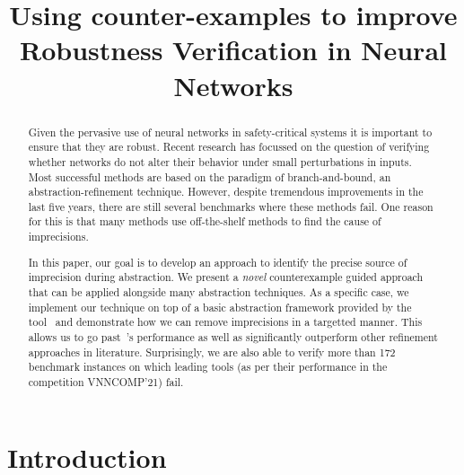 \documentclass{llncs}
\title{Using counter-examples to improve Robustness Verification in Neural Networks}
\author{}
\institute{}
\begin{document}
\maketitle

\begin{abstract}
  Given the pervasive use of neural networks in safety-critical systems it is important to ensure that they are robust. Recent research has focussed on the question of verifying whether networks do not alter their behavior under small perturbations in inputs. Most successful methods are based on the paradigm of branch-and-bound, an abstraction-refinement technique. However, despite tremendous improvements in the last five years, there are still several benchmarks where these methods fail. One reason for this is that many methods use off-the-shelf methods to find the cause of imprecisions.  %

In this paper, our goal is to develop an approach to identify the precise source of imprecision during abstraction. We present a {\em novel} counterexample guided approach that can be applied alongside many abstraction techniques. As a specific case, we implement our technique on top of a basic abstraction framework provided by the tool~\deeppoly{} and demonstrate how we can remove imprecisions in a targetted manner. This allows us to go past~\deeppoly{}'s performance as well as significantly outperform other refinement approaches in literature. Surprisingly, we are also able to verify more than 172 benchmark instances on which leading tools (as per their performance in the competition VNNCOMP'21) fail. 

\end{abstract}

\section{Introduction}
\label{sec:intro}

\end{document}
